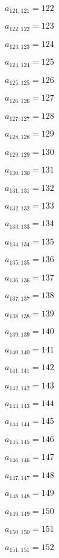 \documentclass[a4paper,12pt]{article}
\begin{document}
$a _{ 121, 121 } = 122$

$a _{ 122, 122 } = 123$

$a _{ 123, 123 } = 124$

$a _{ 124, 124 } = 125$

$a _{ 125, 125 } = 126$

$a _{ 126, 126 } = 127$

$a _{ 127, 127 } = 128$

$a _{ 128, 128 } = 129$

$a _{ 129, 129 } = 130$

$a _{ 130, 130 } = 131$

$a _{ 131, 131 } = 132$

$a _{ 132, 132 } = 133$

$a _{ 133, 133 } = 134$

$a _{ 134, 134 } = 135$

$a _{ 135, 135 } = 136$

$a _{ 136, 136 } = 137$

$a _{ 137, 137 } = 138$

$a _{ 138, 138 } = 139$

$a _{ 139, 139 } = 140$

$a _{ 140, 140 } = 141$

$a _{ 141, 141 } = 142$

$a _{ 142, 142 } = 143$

$a _{ 143, 143 } = 144$

$a _{ 144, 144 } = 145$

$a _{ 145, 145 } = 146$

$a _{ 146, 146 } = 147$

$a _{ 147, 147 } = 148$

$a _{ 148, 148 } = 149$

$a _{ 149, 149 } = 150$

$a _{ 150, 150 } = 151$

$a _{ 151, 151 } = 152$
\end{document}
